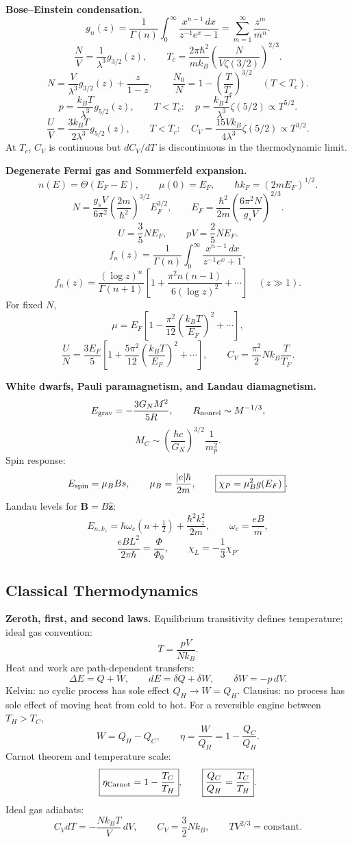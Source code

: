 \noindent\textbf{Bose--Einstein condensation.}\quad
\[
g_n(z)=\frac{1}{\Gamma(n)}
\int_0^\infty\frac{x^{n-1}\,dx}{z^{-1}e^x-1}
=\sum_{m=1}^\infty\frac{z^m}{m^n}.
\]
\[
\frac{N}{V}=\frac{1}{\lambda^3}g_{3/2}(z),
\qquad
\boxed{T_c=\frac{2\pi\hbar^2}{mk_B}
\left(\frac{N}{V\zeta(3/2)}\right)^{2/3}}.
\]
\[
N=\frac{V}{\lambda^3}g_{3/2}(z)+\frac{z}{1-z},
\qquad
\boxed{\frac{N_0}{N}=1-\left(\frac{T}{T_c}\right)^{3/2}}\quad(T<T_c).
\]
\[
p=\frac{k_BT}{\lambda^3}g_{5/2}(z),
\qquad
T<T_c:\quad p=\frac{k_BT}{\lambda^3}\zeta(5/2)\propto T^{5/2}.
\]
\[
\frac{U}{V}=\frac{3k_BT}{2\lambda^3}g_{5/2}(z),
\qquad
T<T_c:\quad C_V=\frac{15Vk_B}{4\lambda^3}\zeta(5/2)\propto T^{3/2}.
\]
At $T_c$, $C_V$ is continuous but $dC_V/dT$ is discontinuous in the
thermodynamic limit.

\noindent\textbf{Degenerate Fermi gas and Sommerfeld expansion.}\quad
\[
n(E)=\Theta(E_F-E),\qquad
\mu(0)=E_F,\qquad
\hbar k_F=(2mE_F)^{1/2}.
\]
\[
N=\frac{g_sV}{6\pi^2}
\left(\frac{2m}{\hbar^2}\right)^{3/2}E_F^{3/2},
\qquad
\boxed{E_F=\frac{\hbar^2}{2m}
\left(\frac{6\pi^2N}{g_sV}\right)^{2/3}}.
\]
\[
U=\frac35NE_F,\qquad
\boxed{pV=\frac25NE_F}.
\]
\[
f_n(z)=\frac{1}{\Gamma(n)}
\int_0^\infty\frac{x^{n-1}\,dx}{z^{-1}e^x+1},
\]
\[
f_n(z)=\frac{(\log z)^n}{\Gamma(n+1)}
\left[1+\frac{\pi^2n(n-1)}{6(\log z)^2}+\cdots\right]\quad(z\gg1).
\]
For fixed $N$,
\[
\mu=E_F\left[1-\frac{\pi^2}{12}
\left(\frac{k_BT}{E_F}\right)^2+\cdots\right],
\]
\[
\frac{U}{N}=\frac{3E_F}{5}
\left[1+\frac{5\pi^2}{12}
\left(\frac{k_BT}{E_F}\right)^2+\cdots\right],
\qquad
\boxed{C_V=\frac{\pi^2}{2}Nk_B\frac{T}{T_F}}.
\]

\noindent\textbf{White dwarfs, Pauli paramagnetism, and Landau diamagnetism.}\quad
\[
E_{\rm grav}=-\frac{3G_NM^2}{5R},\qquad
R_{\rm nonrel}\sim M^{-1/3},
\]
\[
\boxed{M_C\sim\left(\frac{\hbar c}{G_N}\right)^{3/2}\frac{1}{m_p^2}}.
\]
Spin response:
\[
E_{\rm spin}=\mu_BBs,\qquad
\mu_B=\frac{|e|\hbar}{2m},
\qquad
\boxed{\chi_P=\mu_B^2g(E_F)}.
\]
Landau levels for $\mathbf B=B\hat{\mathbf z}$:
\[
E_{n,k_z}=\hbar\omega_c(n+\tfrac12)+\frac{\hbar^2k_z^2}{2m},
\qquad
\omega_c=\frac{eB}{m},
\]
\[
\frac{eBL^2}{2\pi\hbar}=\frac{\Phi}{\Phi_0},
\qquad
\boxed{\chi_L=-\frac13\chi_P}.
\]

\subsection{Classical Thermodynamics}

\noindent\textbf{Zeroth, first, and second laws.}\quad
Equilibrium transitivity defines temperature; ideal gas convention:
\[
\boxed{T=\frac{pV}{Nk_B}}.
\]
Heat and work are path-dependent transfers:
\[
\Delta E=Q+W,\qquad dE=\delta Q+\delta W,\qquad
\boxed{\delta W=-p\,dV}.
\]
Kelvin: no cyclic process has sole effect $Q_H\to W=Q_H$.
Clausius: no process has sole effect of moving heat from cold to hot.
For a reversible engine between $T_H>T_C$,
\[
W=Q_H-Q_C,\qquad
\boxed{\eta=\frac{W}{Q_H}=1-\frac{Q_C}{Q_H}}.
\]
Carnot theorem and temperature scale:
\[
\boxed{\eta_{\rm Carnot}=1-\frac{T_C}{T_H}},
\qquad
\boxed{\frac{Q_C}{Q_H}=\frac{T_C}{T_H}}.
\]
Ideal gas adiabats:
\[
C_VdT=-\frac{Nk_BT}{V}\,dV,\qquad
C_V=\frac32Nk_B,\qquad
\boxed{TV^{2/3}=\text{constant}}.
\]

